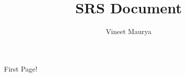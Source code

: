 \documentclass{report}
\title{\color{white} SRS Document}
\author{\color{white} Vineet Maurya}
\begin{document}
\afterpage{\restorepagecolor}
\maketitle
\newpage
First Page!
\end{document}
